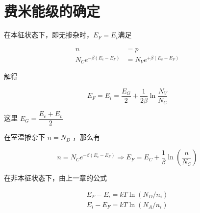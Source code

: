 \documentclass[cn,11pt,chinese,black,simple]{../elegantbook}
\begin{document}
\section{费米能级的确定}

在本征状态下，即无掺杂时，\(E_F = E_i\)满足

\[
\begin{aligned}
    n &= p \\
    N_C e^{-\beta (E_c - E_F)} &= N_V  e^{+ \beta (E_v - E_F)}
\end{aligned}    
\]

解得 

\[
E_F = E_i = \dfrac{E_G}{2} + \dfrac{1}{2\beta} \ln \dfrac{N_V}{N_C}
\]

这里 \(E_G = \dfrac{E_c + E_v}{2}\)

在室温掺杂下 \(n = N_D\) ，那么有

\[n=N_{C} e^{-\beta\left(E_{c}-E_{F}\right)} \Rightarrow E_{F}=E_{C}+\dfrac{1}{\beta} \ln \left(\dfrac{n}{N_{C}}\right)\]

在非本征状态下，由上一章的公式 

\[\begin{array}{l}
    E_{ F }-E_{ i }=k T \ln \left(N_{ D } / n_{ i }\right) \\
    E_{ i }-E_{ F }=k T \ln \left(N_{ A } / n_{ i }\right)
\end{array}\]


\ifx\mainclass\undefined
\end{document}
